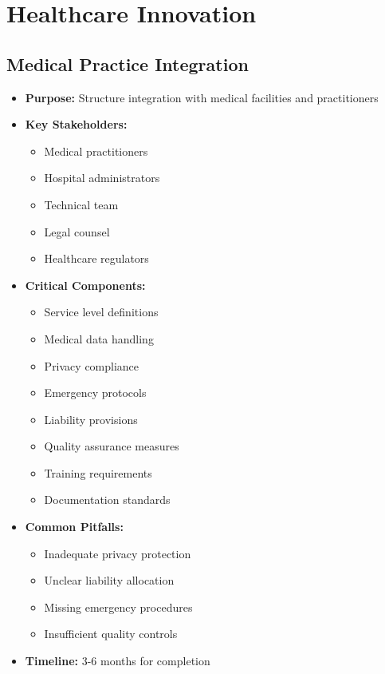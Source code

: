 \section{Healthcare Innovation}

\subsection{Medical Practice Integration}
\begin{tcolorbox}[colback=white,colframe=primarydark,title=\textbf{Healthcare Integration Documentation}]
\begin{itemize}
    \item \textbf{Purpose:} Structure integration with medical facilities and practitioners
    \item \textbf{Key Stakeholders:}
    \begin{itemize}
        \item Medical practitioners
        \item Hospital administrators
        \item Technical team
        \item Legal counsel
        \item Healthcare regulators
    \end{itemize}
    \item \textbf{Critical Components:}
    \begin{itemize}
        \item Service level definitions
        \item Medical data handling
        \item Privacy compliance
        \item Emergency protocols
        \item Liability provisions
        \item Quality assurance measures
        \item Training requirements
        \item Documentation standards
    \end{itemize}
    \item \textbf{Common Pitfalls:}
    \begin{itemize}
        \item Inadequate privacy protection
        \item Unclear liability allocation
        \item Missing emergency procedures
        \item Insufficient quality controls
    \end{itemize}
    \item \textbf{Timeline:} 3-6 months for completion
\end{itemize}


\end{tcolorbox}
